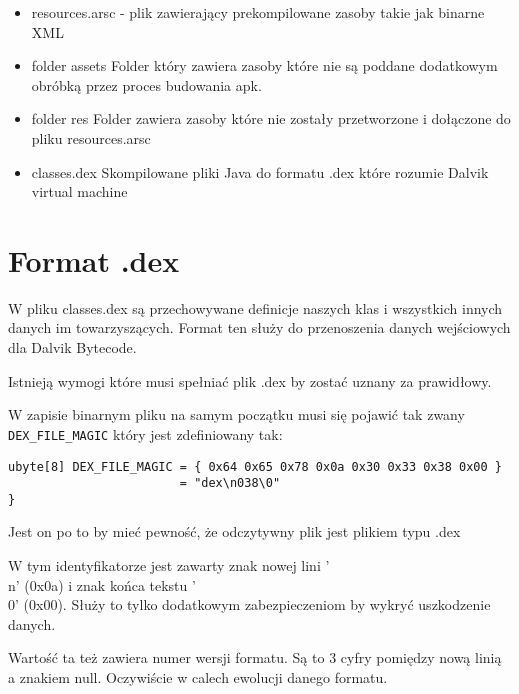 \documentclass[12pt,a4paper,leqno,oneside,titlepage]{book}
\begin{document}
\begin{itemize}
\item resources.arsc - plik zawierający prekompilowane zasoby takie jak binarne XML

\item folder assets
Folder który zawiera zasoby które nie są poddane dodatkowym obróbką przez proces budowania apk.

\item folder res
Folder zawiera zasoby które nie zostały przetworzone i dołączone do pliku resources.arsc

\item classes.dex Skompilowane pliki Java do formatu .dex które rozumie Dalvik virtual machine

\end{itemize}



\section{Format .dex}

W pliku classes.dex są przechowywane definicje naszych klas i wszystkich innych danych im towarzyszących.
Format ten służy do przenoszenia danych wejściowych dla Dalvik Bytecode. 

Istnieją wymogi które musi spełniać plik .dex by zostać uznany za prawidłowy.


W zapisie binarnym pliku na samym początku musi się pojawić tak zwany \verb|DEX_FILE_MAGIC| który jest zdefiniowany tak:

\begin{lstlisting}
ubyte[8] DEX_FILE_MAGIC = { 0x64 0x65 0x78 0x0a 0x30 0x33 0x38 0x00 }
                        = "dex\n038\0"
}
\end{lstlisting}

Jest on po to by mieć pewność, że odczytywny plik jest plikiem typu .dex

W tym identyfikatorze jest zawarty znak nowej lini '\\n' (0x0a) i znak końca tekstu '\\0' (0x00). Służy to tylko dodatkowym zabezpieczeniom by wykryć uszkodzenie danych.

Wartość ta też zawiera numer wersji formatu. Są to 3 cyfry pomiędzy nową linią a znakiem null. Oczywiście w calech ewolucji danego formatu.
\end{document}
